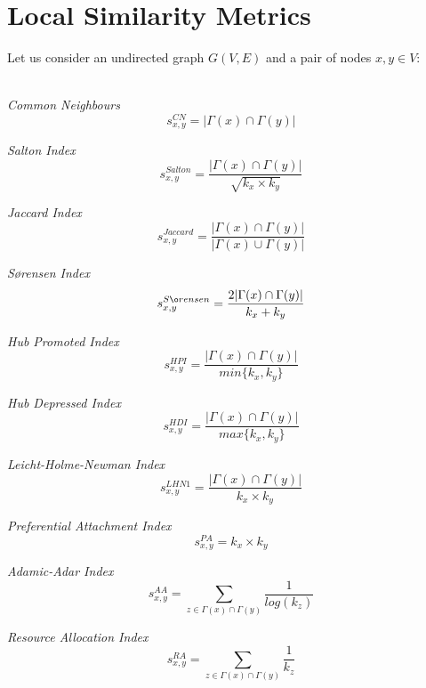 \section{Local Similarity Metrics}
\label{sec:metrics}

Let us consider an undirected graph $G(V,E)$ and a pair of nodes $x,y\in V$:

\noindent\\
\textit{Common Neighbours}
\begin{equation}
\label{eqn:common-neighbours}
s^{CN}_{x,y}= |\Gamma(x) \cap \Gamma(y)|
\end{equation}

\noindent
\textit{Salton Index}
\begin{equation}
\label{eqn:salton}
s^{Salton}_{x,y}=
\frac{ |\Gamma(x) \cap \Gamma(y)|}{\sqrt{k_{x} \times k_{y}}}
\end{equation}

\noindent
\textit{Jaccard Index}
\begin{equation}
\label{eqn:jaccard}
s^{Jaccard}_{x,y}=
\frac{|\Gamma(x) \cap \Gamma(y)|}{|\Gamma(x) \cup \Gamma(y)|}
\end{equation}

\noindent
\textit{S\o rensen Index}
\begin{equation}
\label{eqn:sorensen}
s^{S\o rensen}_{x,y}=
\frac{2|\Gamma(x) \cap \Gamma(y)|}{k_{x} + k_{y}}
\end{equation}

\noindent
\textit{Hub Promoted Index}
\begin{equation}
\label{eqn:hpi}
s^{HPI}_{x,y}=
\frac{|\Gamma(x) \cap \Gamma(y)|}{min\{k_{x},k_{y}\}}
\end{equation}

\noindent
\textit{Hub Depressed Index}
\begin{equation}
\label{eqn:hdi}
s^{HDI}_{x,y}=
\frac{|\Gamma(x) \cap \Gamma(y)|}{max\{k_{x},k_{y}\}}
\end{equation}

\noindent
\textit{Leicht-Holme-Newman Index}
\begin{equation}
\label{eqn:lhn1}
s^{LHN1}_{x,y}=
\frac{|\Gamma(x) \cap \Gamma(y)|}{k_{x} \times k_{y}}
\end{equation}

\noindent
\textit{Preferential Attachment Index}
\begin{equation}
\label{eqn:pa}
s^{PA}_{x,y}= k_{x} \times k_{y}
\end{equation}

\noindent
\textit{Adamic-Adar Index}
\begin{equation}
\label{eqn:adamic-adar}
s^{AA}_{x,y}=
\sum\limits_{z\in \Gamma(x) \cap \Gamma(y)}\frac{1}{log(k_{z})}
\end{equation}

\noindent
\textit{Resource Allocation Index}
\begin{equation}
\label{eqn:resource-allocation}
s^{RA}_{x,y}=
\sum\limits_{z\in \Gamma(x) \cap \Gamma(y)}\frac{1}{k_{z}}
\end{equation}



